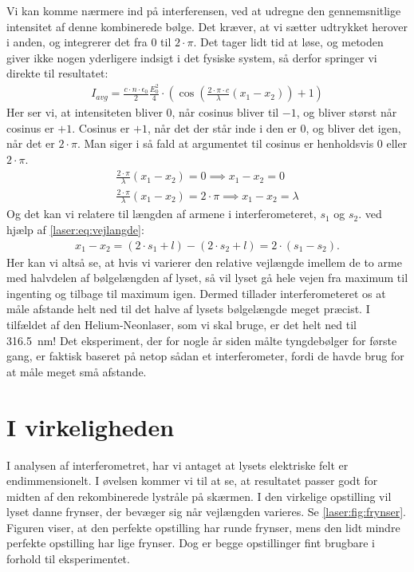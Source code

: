 \documentclass[crop=false, class=memoir]{standalone}
\begin{document}
Vi kan komme nærmere ind på interferensen, ved at udregne den gennemsnitlige intensitet af denne kombinerede bølge. Det kræver, at vi sætter udtrykket herover i anden, og integrerer det fra $0$ til $2\cdot \pi$. Det tager lidt tid at løse, og metoden giver ikke nogen yderligere indsigt i det fysiske system, så derfor springer vi direkte til resultatet:
%
\begin{align}
    I_{avg} = \frac{c\cdot n \cdot \epsilon_0}{2}\frac{E_0^2}{4} \cdot \left( \cos\left({\frac{2\cdot\pi\cdot c}{\lambda}}(x_1-x_2)\right) + 1 \right)
\end{align}
%
Her ser vi, at intensiteten bliver 0, når cosinus bliver til $-1$, og bliver størst når cosinus er $+1$. Cosinus er $+1$, når det der står inde i den er 0, og bliver det igen, når det er $2\cdot \pi$. Man siger i så fald at argumentet til cosinus er henholdsvis $0$ eller $2\cdot\pi$. 
%
\begin{align}
    {\frac{2\cdot\pi}{\lambda}}(x_1-x_2) = 0 \implies x_1 - x_2 = 0\\
    {\frac{2\cdot\pi}{\lambda}}(x_1-x_2) = 2\cdot \pi \implies x_1 - x_2 = \lambda
\end{align}
%
Og det kan vi relatere til længden af armene i interferometeret, $s_1$ og $s_2$. ved hjælp af \cref{laser:eq:vejlangde}:
%
\begin{align}
    x_1 - x_2 = (2\cdot s_1 + l) - (2\cdot s_2 + l) = 2\cdot(s_1 - s_2).
\end{align}
%
Her kan vi altså se, at hvis vi varierer den relative vejlængde imellem de to arme med halvdelen af bølgelængden af lyset, så vil lyset gå hele vejen fra maximum til ingenting og tilbage til maximum igen. Dermed tillader interferometeret os at måle afstande helt ned til det halve af lysets bølgelængde meget præcist. I tilfældet af den Helium-Neonlaser, som vi skal bruge, er det helt ned til \SI{316.5}{\nano\meter}! Det eksperiment, der for nogle år siden målte tyngdebølger for første gang, er faktisk baseret på netop sådan et interferometer, fordi de havde brug for at måle meget små afstande.

\section{I virkeligheden}
I analysen af interferometret, har vi antaget at lysets elektriske felt er endimmensionelt. I øvelsen kommer vi til at se, at resultatet passer godt for midten af den rekombinerede lystråle på skærmen. I den virkelige opstilling vil lyset danne frynser, der bevæger sig når vejlængden varieres. Se \cref{laser:fig:frynser}. Figuren viser, at den perfekte opstilling har runde frynser, mens den lidt mindre perfekte opstilling har lige frynser. Dog er begge opstillinger fint brugbare i forhold til eksperimentet.
\end{document}
